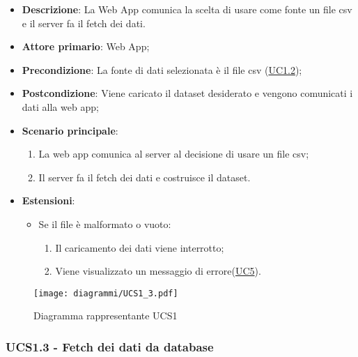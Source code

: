 \begin{itemize}

	\item \textbf{Descrizione}: La Web App comunica la scelta di usare come fonte un file csv e il server fa il fetch dei dati.
	
    \item \textbf{Attore primario}: Web App;
	        
    \item \textbf{Precondizione}:   La fonte di dati selezionata è il file csv (\hyperref[ssub:uc1.2]{UC1.2});

    \item \textbf{Postcondizione}:  Viene caricato il dataset desiderato  e vengono comunicati i dati alla web app;

	\item \textbf{Scenario principale}:
		\begin{enumerate}
			\item La web app comunica al server al decisione di usare un file csv;
            \item Il server fa il fetch dei dati e costruisce il dataset.
        \end{enumerate}
		
	\item \textbf{Estensioni}:
		\begin{itemize}
		
			\item Se il file è malformato o vuoto:
			\begin{enumerate}
				
				\item Il caricamento dei dati viene interrotto;
				\item Viene visualizzato un messaggio di errore(\hyperref[sub:uc5]{UC5}).
				
			\end{enumerate}
		
		\end{itemize}
	
\end{itemize}

\begin{figure}[h]
    \centering
    \texttt{[image: diagrammi/UCS1\_3.pdf]}
    \caption{Diagramma rappresentante UCS1}
    \label{fig:UCS1_3}
\end{figure}

\subsubsection{UCS1.3 - Fetch dei dati da database}
\label{ssub:ucs1.3}

